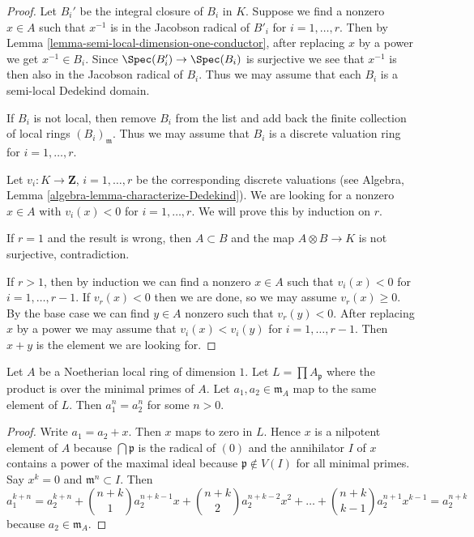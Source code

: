 \begin{proof}
Let $B_i'$ be the integral closure of $B_i$ in $K$. Suppose we find a
nonzero $x \in A$ such that $x^{-1}$ is in the Jacobson radical of $B'_i$ for
$i = 1, \ldots, r$. Then by
Lemma \ref{lemma-semi-local-dimension-one-conductor},
after replacing $x$ by a power we get $x^{-1} \in B_i$.
Since $\Spec(B'_i) \to \Spec(B_i)$ is surjective we
see that $x^{-1}$ is then also in the Jacobson radical of $B_i$.
Thus we may assume that each $B_i$ is a semi-local Dedekind domain.

\medskip\noindent
If $B_i$ is not local, then remove $B_i$ from the list and
add back the finite collection of local rings $(B_i)_\mathfrak m$.
Thus we may assume that $B_i$ is a discrete valuation ring for
$i = 1, \ldots, r$.

\medskip\noindent
Let $v_i : K \to \mathbf{Z}$, $i = 1, \ldots, r$
be the corresponding discrete valuations (see
Algebra, Lemma \ref{algebra-lemma-characterize-Dedekind}).
We are looking for a nonzero $x \in A$ with $v_i(x) < 0$ for
$i = 1, \ldots, r$. We will prove this by induction on $r$.

\medskip\noindent
If $r = 1$ and the result is wrong, then $A \subset B$ and the map
$A \otimes B \to K$ is not surjective, contradiction.

\medskip\noindent
If $r > 1$, then by induction we can find a nonzero $x \in A$ such that
$v_i(x) < 0$ for $i = 1, \ldots, r - 1$. If $v_r(x) < 0$ then we are
done, so we may assume $v_r(x) \geq 0$. By the base case we can find
$y \in A$ nonzero such that $v_r(y) < 0$. After replacing $x$ by a
power we may assume that $v_i(x) < v_i(y)$ for $i = 1, \ldots, r - 1$.
Then $x + y$ is the element we are looking for.
\end{proof}

\begin{lemma}
\label{lemma-power-equal}
Let $A$ be a Noetherian local ring of dimension $1$.
Let $L = \prod A_\mathfrak p$ where the product is over
the minimal primes of $A$. Let $a_1, a_2 \in \mathfrak m_A$
map to the same element of $L$. Then $a_1^n = a_2^n$ for
some $n > 0$.
\end{lemma}

\begin{proof}
Write $a_1 = a_2 + x$. Then $x$ maps to zero in $L$. Hence
$x$ is a nilpotent element of $A$ because $\bigcap \mathfrak p$
is the radical of $(0)$ and the annihilator $I$ of $x$ contains
a power of the maximal ideal because $\mathfrak p \not \in V(I)$
for all minimal primes. Say $x^k = 0$ and $\mathfrak m^n \subset I$.
Then
$$
a_1^{k + n} = a_2^{k + n} + {n + k \choose 1} a_2^{n + k - 1} x +
{n + k \choose 2} a_2^{n + k - 2} x^2 + \ldots +
{n + k \choose k - 1} a_2^{n + 1} x^{k - 1} = a_2^{n + k}
$$
because $a_2 \in \mathfrak m_A$.
\end{proof}

